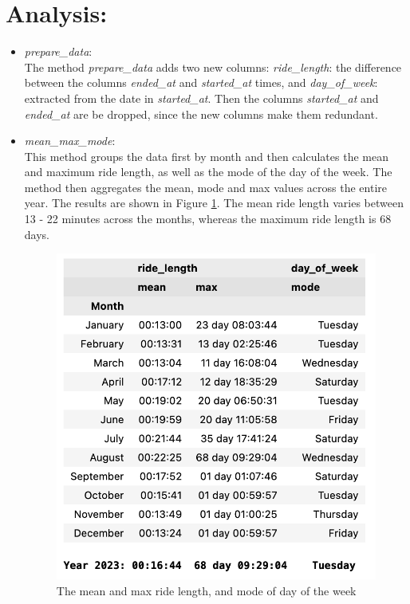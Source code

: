 \documentclass[12pt]{article}
\begin{document}
\section*{Analysis:}
\begin{itemize}
\item \textit{prepare\_data}:\\
	The method \textit{prepare\_data} adds two new columns: \textit{ride\_length}: the difference between the columns \textit{ended\_at} and \textit{started\_at} times, and \textit{day\_of\_week}: extracted from the date in \textit{started\_at}. Then the columns \textit{started\_at} and \textit{ended\_at} are be dropped, since the new columns make them redundant.
	
\item \textit{mean\_max\_mode}:\\	
	This method groups the data first by month and then calculates the mean and maximum ride length, as well as the mode of the day of the week. The method then aggregates the mean, mode and max values across the entire year. The results are shown in Figure \ref{fig9}. The mean ride length varies between 13 - 22 minutes across the months, whereas the maximum ride length is 68 days. 
	
	\begin{figure}[h]
	\centering
	\includegraphics[scale=0.7]{imgMeanMax1.png} 
	\caption{The mean and max ride length, and mode of day of the week}
	\label{fig9}
	\end{figure}
	

\end{itemize}
\end{document}
